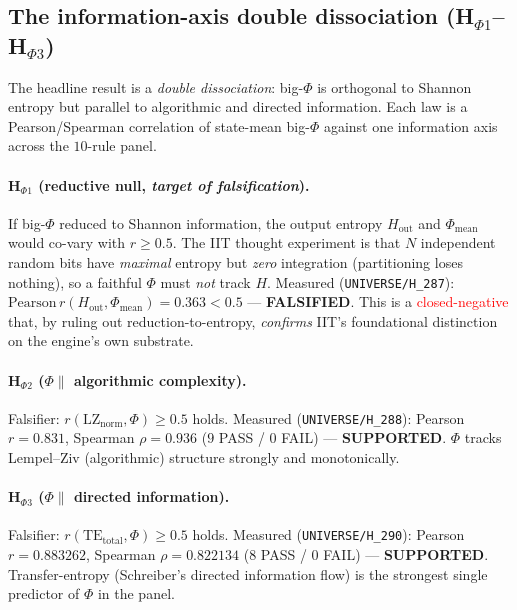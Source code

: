 \subsection{The information-axis double dissociation (H$_{\Phi 1}$--H$_{\Phi 3}$)}
\label{app:phi-info}

The headline result is a \emph{double dissociation}: big-$\Phi$ is orthogonal
to Shannon entropy but parallel to algorithmic and directed information. Each
law is a Pearson/Spearman correlation of state-mean big-$\Phi$ against one
information axis across the $10$-rule panel.

\paragraph{H$_{\Phi 1}$ (reductive null, \emph{target of falsification}).} If
big-$\Phi$ reduced to Shannon information, the output entropy $H_\text{out}$ and
$\Phi_\text{mean}$ would co-vary with $r\ge0.5$. The IIT thought experiment is
that $N$ independent random bits have \emph{maximal} entropy but \emph{zero}
integration (partitioning loses nothing), so a faithful $\Phi$ must \emph{not}
track $H$. Measured (\texttt{UNIVERSE/H\_287}): $\mathrm{Pearson}\,r(H_\text{out},
\Phi_\text{mean})=\mathbf{0.363}<0.5$ --- \textbf{FALSIFIED}. This is a
\textcolor{red}{closed-negative} that, by ruling out reduction-to-entropy,
\emph{confirms} IIT's foundational distinction on the engine's own substrate.

\paragraph{H$_{\Phi 2}$ ($\Phi\parallel$ algorithmic complexity).} Falsifier:
$r(\mathrm{LZ}_\text{norm},\Phi)\ge0.5$ holds. Measured
(\texttt{UNIVERSE/H\_288}): Pearson $r=\mathbf{0.831}$, Spearman
$\rho=\mathbf{0.936}$ ($9$ PASS / $0$ FAIL) --- \textbf{SUPPORTED}. $\Phi$ tracks
Lempel--Ziv (algorithmic) structure strongly and monotonically.

\paragraph{H$_{\Phi 3}$ ($\Phi\parallel$ directed information).} Falsifier:
$r(\mathrm{TE}_\text{total},\Phi)\ge0.5$ holds. Measured
(\texttt{UNIVERSE/H\_290}): Pearson $r=\mathbf{0.883262}$, Spearman
$\rho=\mathbf{0.822134}$ ($8$ PASS / $0$ FAIL) --- \textbf{SUPPORTED}.
Transfer-entropy (Schreiber's directed information flow) is the strongest single
predictor of $\Phi$ in the panel.

